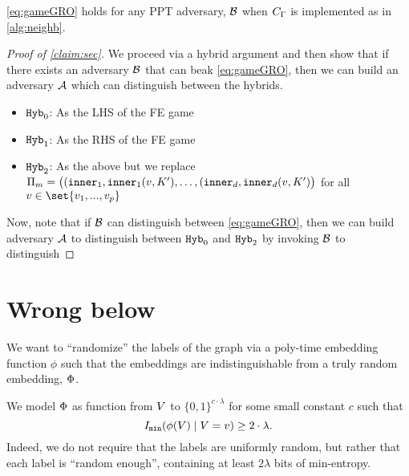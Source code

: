 \begin{claim} 
	\label{claim:sec}
	\cref{eq:gameGRO} holds for any PPT adversary, $\mathcal{B}$ when $C_\Gamma$ is implemented as in \cref{alg:neighb}.
\end{claim}
\begin{proof}[Proof of \cref{claim:sec}]
We proceed via a hybrid argument and then show that if there exists an adversary $\mathcal{B}$ that can beak \cref{eq:gameGRO},
then we can build an adversary $\mathcal{A}$ which can distinguish between the hybrids.

\begin{itemize}
	\item $\texttt{Hyb}_0$: As the LHS of the FE game
	\item $\texttt{Hyb}_1$: As the RHS of the FE game
	\item $\texttt{Hyb}_2$: As the above but we replace $\Pi_m = \big((\texttt{inner}_1, \texttt{inner}_1(v, K'), \dots, (\texttt{inner}_d, \texttt{inner}_d(v, K')\big)$
	for all $v \in \set{v_1, ..., v_p}$
\end{itemize}

Now, note that if $\mathcal{B}$ can distinguish between \cref{eq:gameGRO}, then we can build adversary $\mathcal{A}$ to distinguish between $\texttt{Hyb}_0$ and $\texttt{Hyb}_2$ by invoking $\mathcal{B}$ to distinguish
\end{proof}




\section{Wrong below}

We want to ``randomize'' the labels of the graph via a poly-time embedding function $\phi$
such that the embeddings are indistinguishable from a truly random embedding, $\Phi$.

We model $\Phi$ as function from $V$ to $\{0, 1\}^{c \cdot \lambda}$ for some small constant $c$
such that 
\begin{equation*}
	I_\texttt{min}(\phi(V) \mid V = v) \geq 2 \cdot \lambda.
\end{equation*}
Indeed, we do not require that the labels are uniformly random, but rather that each label is ``random enough'',
containing at least $2 \lambda$ bits of min-entropy.


